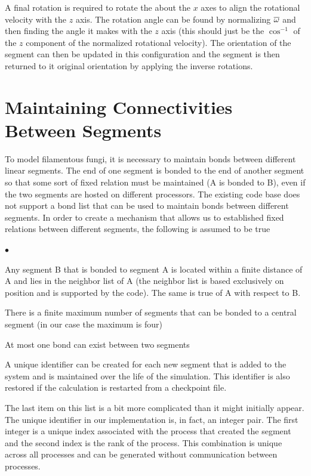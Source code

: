 \documentclass[12pt]{article}
\begin{document}
A final rotation is required to rotate the about the $x$ axes to align the rotational
velocity with the $z$ axis. The rotation angle can be found by normalizing $\overline{\omega}$
and then finding the angle it makes with the $z$ axis (this should just be the
$\cos^{-1}$ of the $z$ component of the normalized rotational velocity). The
orientation of the segment can then be updated in this configuration and the segment
is then returned to it original orientation by applying the inverse rotations.

\section{Maintaining Connectivities Between Segments}
To model filamentous fungi, it is necessary to maintain bonds between
different linear segments. The end of one segment is bonded to the end of another
segment so that some sort of fixed relation must be maintained (A is bonded to B),
even if the two segments are hosted on different processors. The existing code
base does not support a bond list that can be used to maintain bonds
between different segments. In order to create a mechanism that allows us to
established fixed relations between different segments, the following is assumed
to be true
\begin{list}{$\bullet$}{}
\item Any segment B that is bonded to segment A is located within a finite
distance of A and lies in the neighbor list of A (the neighbor list is based
exclusively on position and is supported by the code). The same is true of A with
respect to B.
\item There is a finite maximum number of segments that can be bonded to a
central segment (in our case the maximum is four)
\item At most one bond can exist between two segments
\item A unique identifier can be created for each new segment that is added to the
system and is maintained over the life of the simulation. This identifier is also
restored if the calculation is restarted from a checkpoint file.
\end{list}
The last item on this list is a bit more complicated than it might initially appear.
The unique identifier in our implementation is, in fact, an integer pair. The first
integer is a unique index associated with the process that created the segment and
the second index is the rank of the process. This combination is unique across all
processes and can be generated without communication between processes.
\end{document}
